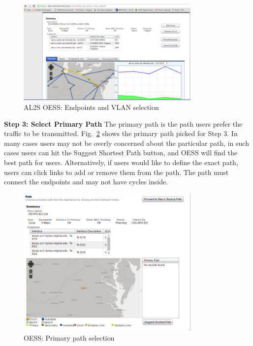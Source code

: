 {\begin{figure}[htb!]
\centering
\includegraphics[width=0.8\textwidth]{figures/oess-AL2S.png}
\caption{AL2S OESS: Endpoints and VLAN selection}
\label{fig:oessal2s}
\end{figure}


\textbf{Step 3: Select Primary Path}
The primary path is the path users prefer the traffic to be transmitted. Fig.~\ref{fig:oessprimary} shows the primary path picked for Step 3. In many cases users may not be overly concerned about the particular path, in such cases users can hit the Suggest Shortest Path button, and OESS will find the best path for users.  Alternatively, if users would like to define the exact path, users can click links to add or remove them from the path. The path must connect the endpoints and may not have cycles inside.
\begin{figure}[htb!]
\centering
\includegraphics[width=0.8\textwidth]{figures/oess-primary.png}
\caption{OESS: Primary path selection}
\label{fig:oessprimary}
\end{figure}

}
